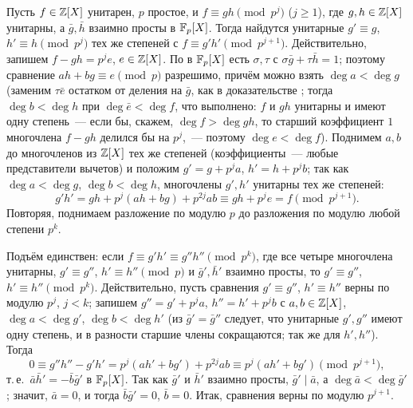 \begin{aside}
Пусть $f\in\mathbb Z[X]$ унитарен, $p$ простое, и $f\equiv gh\pmod{p^j}$ ($j\ge1$), где $g,h\in\mathbb Z[X]$ унитарны, а $\bar g,\bar h$
взаимно просты в $\mathbb F_p[X]$. Тогда найдутся унитарные $g'\equiv g$, $h'\equiv h\pmod{p^j}$ тех же степеней с
$f\equiv g'h'\pmod{p^{j+1}}$. Действительно, запишем $f-gh=p^je$, $e\in\mathbb Z[X]$. По  в $\mathbb F_p[X]$ есть $\sigma,\tau$
с $\sigma\bar g+\tau\bar h=1$; поэтому сравнение $ah+bg\equiv e\pmod p$ разрешимо, причём можно взять $\deg a<\deg g$
(заменим $\tau\bar e$ остатком от деления на $\bar g$, как в доказательстве ; тогда $\deg b<\deg h$ при
$\deg\bar e<\deg f$, что выполнено: $f$ и $gh$ унитарны и имеют одну степень~--- если бы, скажем, $\deg f>\deg gh$, то
старший коэффициент $1$ многочлена $f-gh$ делился бы на $p^j$,~--- поэтому $\deg e<\deg f$). Поднимем $a,b$ до многочленов из
$\mathbb Z[X]$ тех же степеней (коэффициенты~--- любые представители вычетов) и положим $g'=g+p^ja$, $h'=h+p^jb$; так как
$\deg a<\deg g$, $\deg b<\deg h$, многочлены $g',h'$ унитарны тех же степеней:
\[
g'h'=gh+p^j(ah+bg)+p^{2j}ab\equiv gh+p^je=f\pmod{p^{j+1}} .
\]
Повторяя, поднимаем разложение по модулю $p$ до разложения по модулю любой степени $p^k$.

Подъём единствен: если $f\equiv g'h'\equiv g''h''\pmod{p^k}$, где все четыре многочлена унитарны, $g'\equiv g''$,
$h'\equiv h''\pmod p$ и $\bar g',\bar h'$ взаимно просты, то $g'\equiv g''$, $h'\equiv h''\pmod{p^k}$. Действительно,
пусть сравнения $g'\equiv g''$, $h'\equiv h''$ верны по модулю $p^j$, $j<k$; запишем $g''=g'+p^ja$, $h''=h'+p^jb$ с
$a,b\in\mathbb Z[X]$, $\deg a<\deg g'$, $\deg b<\deg h'$ (из $\bar g'=\bar g''$ следует, что унитарные $g',g''$ имеют одну
степень, и в разности старшие члены сокращаются; так же для $h',h''$). Тогда
\[
0\equiv g''h''-g'h'=p^j(ah'+bg')+p^{2j}ab\equiv p^j(ah'+bg')\pmod{p^{j+1}},
\]
т.\,е.\ $\bar a\bar h'=-\bar b\bar g'$ в $\mathbb F_p[X]$. Так как $\bar g'$ и $\bar h'$ взаимно просты, $\bar g'\mid\bar a$, а
$\deg\bar a<\deg\bar g'$; значит, $\bar a=0$, и тогда $\bar b\bar g'=0$, $\bar b=0$. Итак, сравнения верны по модулю
$p^{j+1}$.
\end{aside}

